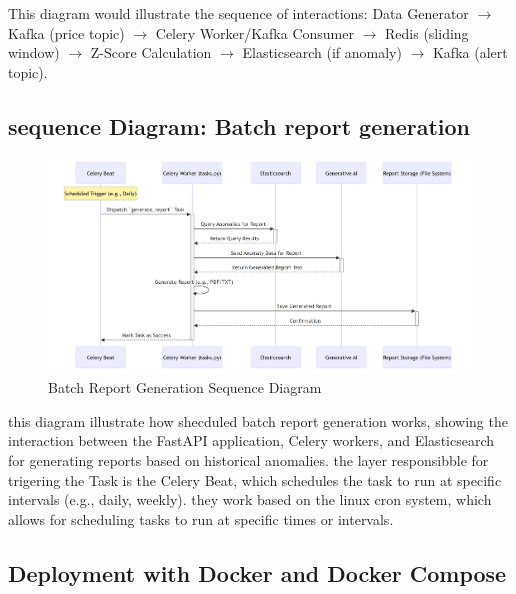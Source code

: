 This diagram would illustrate the sequence of interactions: Data Generator $\rightarrow$ Kafka (price topic) $\rightarrow$ Celery Worker/Kafka Consumer $\rightarrow$ Redis (sliding window) $\rightarrow$ Z-Score Calculation $\rightarrow$ Elasticsearch (if anomaly) $\rightarrow$ Kafka (alert topic).

\break





\subsection{sequence Diagram: Batch report generation}
\begin{figure}[H]
    
    \includegraphics[width=1.2\textwidth]{figures/batch-1.png}
    \caption{Batch Report Generation Sequence Diagram}
    \label{fig:batch_report_generation_sequence_diagram}


\end{figure}


this diagram illustrate how shecduled batch report generation works, showing the interaction between the FastAPI application, Celery workers, and Elasticsearch for generating reports based on historical anomalies.
the layer responsibble for trigering the Task is the Celery Beat, which schedules the task to run at specific intervals (e.g., daily, weekly).
they work based on the linux cron system, which allows for scheduling tasks to run at specific times or intervals.

\subsection{Deployment with Docker and Docker Compose}


